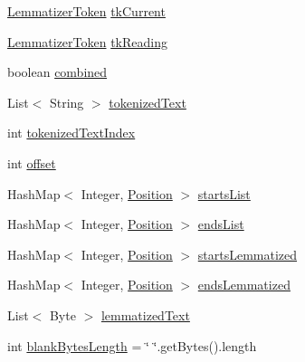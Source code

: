 \begin{DoxyCompactItemize}
\item 
\hyperlink{classbr_1_1usp_1_1cata_1_1util_1_1lemmatizer_1_1_lemmatizer_token}{Lemmatizer\+Token} \hyperlink{classbr_1_1usp_1_1cata_1_1util_1_1lemmatizer_1_1_lemmatizer_a8a1949ce7a9f0d5787f4ad75a83ce183}{tk\+Current}
\item 
\hyperlink{classbr_1_1usp_1_1cata_1_1util_1_1lemmatizer_1_1_lemmatizer_token}{Lemmatizer\+Token} \hyperlink{classbr_1_1usp_1_1cata_1_1util_1_1lemmatizer_1_1_lemmatizer_a2556c5e9033d1749ac1e911b51f3d06b}{tk\+Reading}
\item 
boolean \hyperlink{classbr_1_1usp_1_1cata_1_1util_1_1lemmatizer_1_1_lemmatizer_a24f4973b9dc1d404b6a0d7b212a62484}{combined}
\item 
List$<$ String $>$ \hyperlink{classbr_1_1usp_1_1cata_1_1util_1_1lemmatizer_1_1_lemmatizer_ab5453be564488535adc8bc699992b71c}{tokenized\+Text}
\item 
int \hyperlink{classbr_1_1usp_1_1cata_1_1util_1_1lemmatizer_1_1_lemmatizer_ae0ae785b2feef21dc85f05d87a0e4662}{tokenized\+Text\+Index}
\item 
int \hyperlink{classbr_1_1usp_1_1cata_1_1util_1_1lemmatizer_1_1_lemmatizer_a3051729334b2dc06ccfdfc174e626855}{offset}
\item 
Hash\+Map$<$ Integer, \hyperlink{classbr_1_1usp_1_1cata_1_1model_1_1_position}{Position} $>$ \hyperlink{classbr_1_1usp_1_1cata_1_1util_1_1lemmatizer_1_1_lemmatizer_a35596ef32451200dea1d847f77ca81dd}{starts\+List}
\item 
Hash\+Map$<$ Integer, \hyperlink{classbr_1_1usp_1_1cata_1_1model_1_1_position}{Position} $>$ \hyperlink{classbr_1_1usp_1_1cata_1_1util_1_1lemmatizer_1_1_lemmatizer_aa1c7ffc1a12b20366170487a64092d24}{ends\+List}
\item 
Hash\+Map$<$ Integer, \hyperlink{classbr_1_1usp_1_1cata_1_1model_1_1_position}{Position} $>$ \hyperlink{classbr_1_1usp_1_1cata_1_1util_1_1lemmatizer_1_1_lemmatizer_ace928e8e1187785e623af7d55f68db32}{starts\+Lemmatized}
\item 
Hash\+Map$<$ Integer, \hyperlink{classbr_1_1usp_1_1cata_1_1model_1_1_position}{Position} $>$ \hyperlink{classbr_1_1usp_1_1cata_1_1util_1_1lemmatizer_1_1_lemmatizer_a6970d634314b89b020bb62b16d66182f}{ends\+Lemmatized}
\item 
List$<$ Byte $>$ \hyperlink{classbr_1_1usp_1_1cata_1_1util_1_1lemmatizer_1_1_lemmatizer_a2476d96edabe8b1b909ea9edcc93113b}{lemmatized\+Text}
\item 
int \hyperlink{classbr_1_1usp_1_1cata_1_1util_1_1lemmatizer_1_1_lemmatizer_a37b18bdb5d90947aabb26fba0e58690f}{blank\+Bytes\+Length} = \char`\"{} \char`\"{}.get\+Bytes().length
\end{DoxyCompactItemize}


